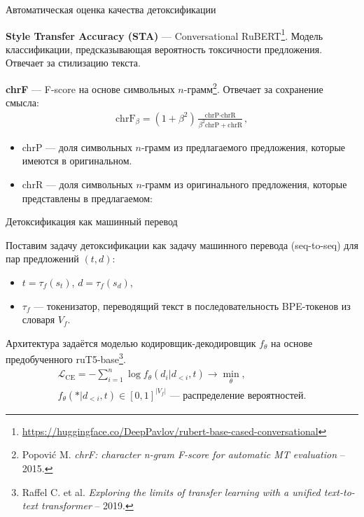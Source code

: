 \documentclass[12pt, fleqn, xcolor=x11names, xcolor=table, aspectratio=169]{beamer}
\begin{document}
\begin{frame}{Автоматическая оценка качества детоксификации}

\textbf{Style Transfer Accuracy (STA)} --- Conversational RuBERT\footnote{\url{https://huggingface.co/DeepPavlov/rubert-base-cased-conversational}}. 
Модель классификации, предсказывающая вероятность токсичности предложения.
Отвечает за стилизацию текста. 

\vfill

\textbf{chrF} --- F-score на основе символьных $n$-грамм\footnote{Popović M. \textit{chrF: character n-gram F-score for automatic MT evaluation} – 2015.}. 
Отвечает за сохранение смысла:
\begin{gather*}
    \text{chrF}_\beta = (1 + \beta^2) \frac{\text{chrP} \cdot \text{chrR}}{\beta^2 \text{chrP} + \text{chrR}},
\end{gather*}

\begin{itemize}
    \item chrP --- доля символьных $n$-грамм из предлагаемого предложения, которые имеются в оригинальном. 
    
    \item chrR --- доля символьных $n$-грамм из оригинального предложения, которые представлены в предлагаемом: 

\end{itemize}

\end{frame}



\begin{frame}{Детоксификация как машинный перевод}

Поставим задачу детоксификации как задачу машинного перевода (seq-to-seq) для пар предложений $(t, d)$:
\begin{itemize}
    \item $t = \tau_f(s_t)$, $d = \tau_f(s_d)$,
    \item $\tau_f$ --- токенизатор, переводящий текст в последовательность BPE-токенов из словаря $V_f$.
\end{itemize}

\vfill

Архитектура задаётся моделью кодировщик-декодировщик $f_{\theta}$ на основе предобученного ruT5-base\footnote{Raffel C. et al. \textit{Exploring the limits of transfer learning with a unified text-to-text transformer} – 2019.}. 
\begin{gather*}
    \mathcal{L}_{\text{CE}} = -\sum_{i=1}^{n} \log f_\theta(d_{i} | d_{<i}, t) \longrightarrow \min_{\theta}, \\
    f_{\theta}(* | d_{<i}, t) \in [0, 1]^{|V_f|} \text{~--- распределение вероятностей}.
\end{gather*}
\end{frame}
\end{document}
